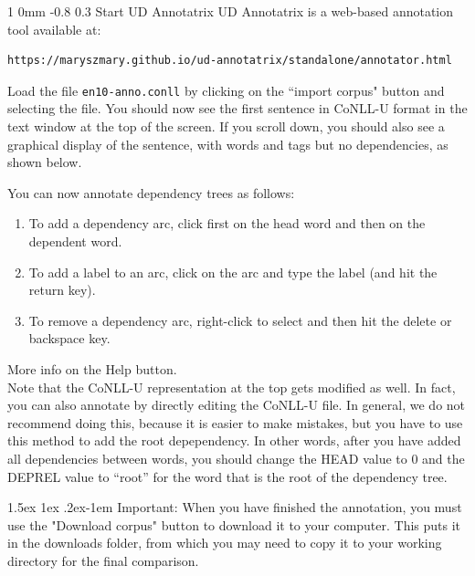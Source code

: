 \documentclass[10.9pt]{article}
\makeatletter
\newcommand{\newsec}[2]{\section{#1}\label{sec:#2}\noindent}
\renewcommand{\section}{\@startsection
{section}%
{1}%
{0mm}%
{-0.8\baselineskip}%
{0.3\baselineskip}%
{\bfseries\large}}%
\renewcommand{\paragraph}{%
  \@startsection{paragraph}{4}%
  {\z@}{1.5ex \@plus 1ex \@minus .2ex}{-1em}%
  {\normalfont\normalsize\bfseries}%
}\makeatother
\makeatother
\begin{document}
\newsec{Start UD Annotatrix}{brat}%
UD Annotatrix is a web-based annotation tool available at: 
\begin{verbatim}
https://maryszmary.github.io/ud-annotatrix/standalone/annotator.html
\end{verbatim}
Load the file {\tt en10-anno.conll} by clicking on the ``import corpus" button and selecting the file. 
You should now see the first sentence in CoNLL-U format in the text window at the top of the screen. 
If you scroll down, you should also see a graphical display of the sentence, with words and tags but no dependencies, as shown below.
\begin{center}
\end{center}
You can now annotate dependency trees as follows:
\begin{enumerate}[topsep=5pt,noitemsep]
\item To add a dependency arc, click first on the head word and then on the dependent word.
\item To add a label to an arc, click on the arc and type the label (and hit the return key).
\item To remove a dependency arc, right-click to select and then hit the delete or backspace key.
\end{enumerate}
More info on the Help button.\\
Note that the CoNLL-U representation at the top gets modified as well. In fact, you can also annotate by directly editing the CoNLL-U file. In general, we do not recommend doing this, because it is easier to make mistakes, but you have to use this method to add the root depependency. In other words, after you have added all dependencies between words, you should change the HEAD value to 0 and the DEPREL value to ``root'' for the word that is the root of the dependency tree. 

\paragraph{Important:} When you have finished the annotation, you must use the "Download corpus" button to download it to your computer. This puts it in the downloads folder, from which you may need to copy it to your working directory for the final comparison. 
\end{document}
